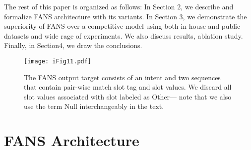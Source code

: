 \documentclass[a4paper]{article}
\begin{document}
 The rest of this paper is organized as follows:   In Section 2,  we describe and formalize FANS architecture with its variants. In Section 3,  we demonstrate the superiority of FANS over a competitive model using both in-house and public datasets and wide rage of experiments. We also discuss results, ablation study. Finally, in Section4, we draw the conclusions. 

\fi

\begin{figure}[h]
  \centering
  \texttt{[image: iFig11.pdf]}
    \caption{ The FANS output target consists of an intent  and two sequences that contain pair-wise match slot tag and slot values. We discard all slot values associated with slot labeled as Other--- note that we also use the term Null interchangeably in the text.}
  \label{fig:lossfunction}
\end{figure}




  
\section{FANS Architecture}
\end{document}
